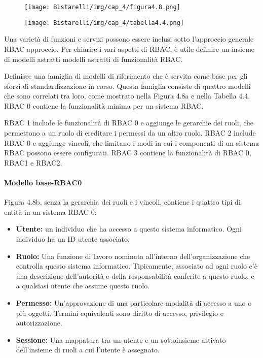 \begin{figure}[H]
	\centering
    \texttt{[image: Bistarelli/img/cap\_4/figura4.8.png]}
\end{figure}

\begin{figure}[H]
	\centering
    \texttt{[image: Bistarelli/img/cap\_4/tabella4.4.png]}
\end{figure}

Una varietà di funzioni e servizi possono essere inclusi sotto l'approccio generale RBAC approccio. Per chiarire i vari aspetti di RBAC, è utile definire un insieme di modelli astratti modelli astratti di funzionalità RBAC.

\singlespacing

Definisce una famiglia di modelli di riferimento che è servita come base per gli sforzi di standardizzazione in corso. Questa famiglia consiste di quattro modelli che sono correlati tra loro, come mostrato nella Figura 4.8a e nella Tabella 4.4. RBAC 0 contiene la funzionalità minima per un sistema RBAC.

\singlespacing

RBAC 1 include le funzionalità di RBAC 0 e aggiunge le gerarchie dei ruoli, che permettono a un ruolo di ereditare i permessi da un altro ruolo. RBAC 2 include RBAC 0 e aggiunge vincoli, che limitano i modi in cui i componenti di un sistema RBAC possono essere configurati. RBAC 3 contiene la funzionalità di RBAC 0, RBAC1 e RBAC2.

\singlespacing

\paragraph{Modello base-RBAC0}

Figura 4.8b, senza la gerarchia dei ruoli e i vincoli, contiene i quattro tipi di entità in un sistema RBAC 0:
\begin{itemize}

    \item \textbf{Utente:} un individuo che ha accesso a questo sistema informatico. Ogni individuo ha un ID utente associato.
    
    \item \textbf{Ruolo:} Una funzione di lavoro nominata all'interno dell'organizzazione che controlla questo sistema informatico. Tipicamente, associato ad ogni ruolo c'è una descrizione dell'autorità e della responsabilità conferite a questo ruolo, e a qualsiasi utente che assume questo ruolo.
    
    \item \textbf{Permesso:} Un'approvazione di una particolare modalità di accesso a uno o più oggetti. Termini equivalenti sono diritto di accesso, privilegio e autorizzazione.
    
    \item \textbf{Sessione:} Una mappatura tra un utente e un sottoinsieme attivato dell'insieme di ruoli a cui l'utente è assegnato.
    
\end{itemize}

